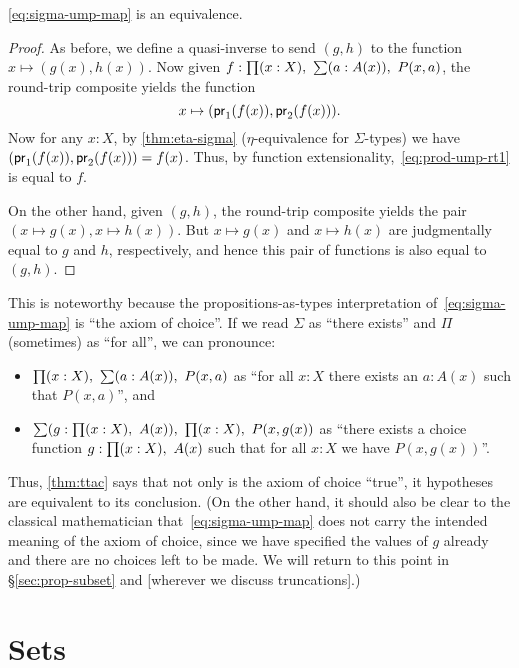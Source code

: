 \begin{thm}\label{thm:ttac}
  \eqref{eq:sigma-ump-map} is an equivalence.
\end{thm}
\begin{proof}
  As before, we define a quasi-inverse to send $(g,h)$ to the function $x\mapsto (g(x),h(x))$.
  Now given $f:\prd{x:X} \sm{a:A(x)} P(x,a)$, the round-trip composite yields the function
  \begin{equation}
    x\mapsto (\mathsf{pr}_{1}(f(x)),\mathsf{pr}_{2}(f(x))).\label{eq:prod-ump-rt1}
  \end{equation}
  Now for any $x:X$, by \autoref{thm:eta-sigma} ($\eta$-equivalence for $\Sigma$-types) we have $(\mathsf{pr}_{1}(f(x)),\mathsf{pr}_{2}(f(x))) = f(x)$.
  Thus, by function extensionality,~\eqref{eq:prod-ump-rt1} is equal to $f$.

  On the other hand, given $(g,h)$, the round-trip composite yields the pair $(x\mapsto g(x),x\mapsto h(x))$.
  But $x\mapsto g(x)$ and $x\mapsto h(x)$ are judgmentally equal to $g$ and $h$, respectively, and hence this pair of functions is also equal to $(g,h)$.
\end{proof}

This is noteworthy because the propositions-as-types interpretation of~\eqref{eq:sigma-ump-map} is ``the axiom of choice''.
If we read $\Sigma$ as ``there exists'' and $\Pi$ (sometimes) as ``for all'', we can pronounce:
\begin{itemize}
\item $\prd{x:X} \sm{a:A(x)} P(x,a)$ as ``for all $x:X$ there exists an $a:A(x)$ such that $P(x,a)$'', and
\item $\sm{g:\prd{x:X} A(x)} \prd{x:X} P(x,g(x))$ as ``there exists a choice function $g:\prd{x:X} A(x)$ such that for all $x:X$ we have $P(x,g(x))$''.
\end{itemize}
Thus, \autoref{thm:ttac} says that not only is the axiom of choice ``true'', it hypotheses are equivalent to its conclusion.
(On the other hand, it should also be clear to the classical mathematician that~\eqref{eq:sigma-ump-map} does not carry the intended meaning of the axiom of choice, since we have specified the values of $g$ already and there are no choices left to be made.
We will return to this point in \S\ref{sec:prop-subset} and [wherever we discuss truncations].)


\section{Sets}
\label{sec:basics-sets}

